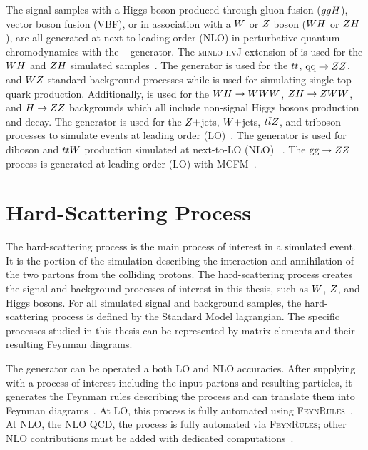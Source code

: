 The signal samples with a Higgs boson produced through gluon fusion ($ggH$), vector boson fusion (VBF),
or in association with a $W$ or $Z$ boson ($WH$ or $ZH$), are all
generated at next-to-leading order (NLO) in perturbative quantum chromodynamics 
with the ~\cite{Nason:2004rx,Frixione:2007vw, Alioli:2010xa, Alioli:2008tz} 
generator. The \textsc{minlo hvJ} extension of  
is used for the $WH$ and $ZH$ simulated samples~\cite{Luisoni:2013kna}. 
The  generator is used for the $t\bar{t}$, $\text{q}\text{q} \to ZZ$, and $WZ$
standard background processes while  is used for simulating 
single top quark production.
Additionally, \POWHEG is used for the $WH \to WWW$, $ZH \to ZWW$,
and $H\to ZZ$ backgrounds which all include non-signal Higgs bosons production and decay.
The \MGAMCNLO generator is used for the $Z+$jets, $W+$jets, $t\bar{t} Z$, and triboson
processes to simulate events at leading order (LO)~\cite{Alwall:2007fs}.
The \MGAMCNLO generator is used for diboson and $t\bar{t} W$ production simulated at next-to-LO (NLO) 
~\cite{Frederix:2012ps}.
The $\text{g}\text{g} \to ZZ$ process is generated at leading order (LO) with 
\textsc{MCFM}~\cite{Campbell:2010ff}. 



\section{Hard-Scattering Process}
The hard-scattering process is the main process of interest in a simulated event.
It is the portion of the simulation describing the interaction and annihilation of the
two partons from the colliding protons. The hard-scattering process creates the 
signal and background processes of interest in this thesis,
such as $W$, $Z$, and Higgs bosons. For all simulated signal and background samples,
the hard-scattering process is defined by the Standard Model lagrangian. The specific processes
studied in this thesis can be represented by matrix elements and their
resulting Feynman diagrams.

The \MGAMCNLO generator can be
operated a both LO and NLO accuracies. After supplying \MGAMCNLO with a process of interest including
the input partons and resulting particles, it generates the Feynman rules describing the 
process and can translate them into Feynman diagrams~\cite{Christensen:2008py}. 
At LO, this process is fully automated using \textsc{FeynRules}~\cite{Christensen:2008py,Alloul:2013bka}.
At NLO, the NLO QCD, the process is fully automated via \textsc{FeynRules}; other NLO contributions 
must be added with dedicated computations~\cite{Alwall:2014hca}.

